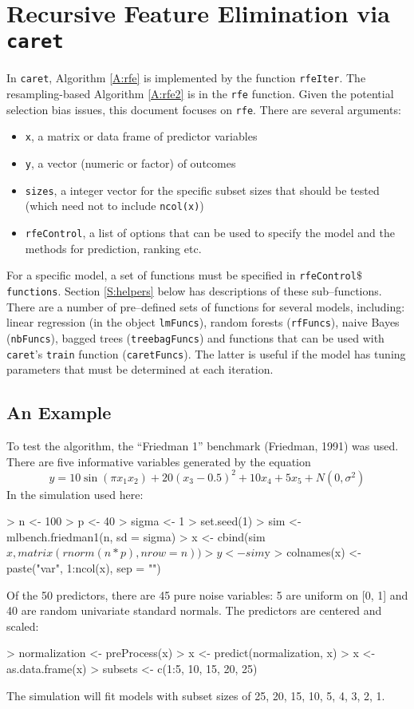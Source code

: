 \documentclass[12pt]{article}
\begin{document}
\clearpage
\section{Recursive Feature Elimination via \texttt{caret}}

In \texttt{caret}, Algorithm \ref{A:rfe} is implemented by the function \texttt{rfeIter}. The resampling-based Algorithm \ref{A:rfe2} is in the \texttt{rfe} function. Given the potential selection bias issues, this document focuses on \texttt{rfe}.  There are several arguments:
\begin{itemize}
\item \texttt{x}, a matrix or data frame of predictor variables
\item \texttt{y}, a vector (numeric or factor) of outcomes
\item \texttt{sizes}, a integer vector for the specific subset sizes that should be tested (which need not to include \texttt{ncol(x)}) 
\item \texttt{rfeControl}, a list of options that can be used to specify the model and the methods for prediction, ranking etc.
\end{itemize}
For a specific model, a set of functions must be specified in \texttt{rfeControl$\$$functions}. Section \ref{S:helpers} below has descriptions of these sub--functions. There are a number of pre--defined sets of functions for several models, including: linear regression (in the object \texttt{lmFuncs}), random forests (\texttt{rfFuncs}), naive Bayes (\texttt{nbFuncs}), bagged trees (\texttt{treebagFuncs}) and functions that can be used with \texttt{caret}'s \texttt{train} function (\texttt{caretFuncs}). The latter is useful if the model has tuning parameters that must be determined at each iteration.


\subsection{An Example}


To test the algorithm, the ``Friedman 1'' benchmark (Friedman, 1991) was used. There are five informative variables generated by the equation
\[
y = 10 \sin(\pi x_1x_2) + 20 (x_3 - 0.5)^2 + 10 x_4 + 5 x_5 + N(0, \sigma^2)
\]
In the simulation used here:
\begin{Schunk}
\begin{Sinput}
> n <- 100
> p <- 40
> sigma <- 1
> set.seed(1)
> sim <- mlbench.friedman1(n, sd = sigma)
> x <- cbind(sim$x, matrix(rnorm(n * p), nrow = n))
> y <- sim$y
> colnames(x) <- paste("var", 1:ncol(x), sep = "")
\end{Sinput}
\end{Schunk}
Of the 50 predictors, there are 45 pure noise variables: 5 are uniform on [0, 1] and 40 are random univariate standard normals. The predictors are centered and scaled:
\begin{Schunk}
\begin{Sinput}
> normalization <- preProcess(x)
> x <- predict(normalization, x)
> x <- as.data.frame(x)
> subsets <- c(1:5, 10, 15, 20, 25)
\end{Sinput}
\end{Schunk}
The simulation will fit models with subset sizes of 25, 20, 15, 10, 5, 4, 3, 2, 1. 
\end{document}
